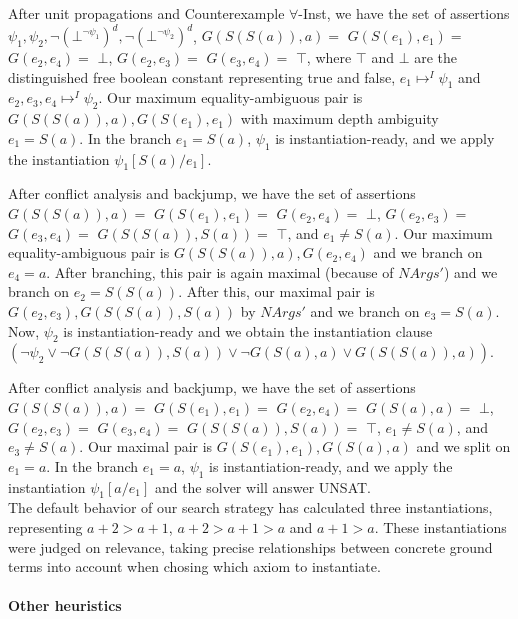 \documentclass{llncs}
\begin{document}
After unit propagations and Counterexample $\forall$-Inst, we have the set of assertions $\psi_1, \psi_2, \neg ( \bot^{\neg \psi_1 })^d, \neg ( \bot^{\neg \psi_2 })^d$, $G( S(S(a)), a) =$ $G( S(e_1), e_1) =$ $G( e_2, e_4 ) =$ $\bot$, $G( e_2, e_3 ) =$ $G( e_3, e_4 ) =$ $\top$, where $\top$ and $\bot$ are the distinguished free boolean constant representing true and false, $e_1 \mapsto^I \psi_1$ and $e_2, e_3, e_4 \mapsto^I \psi_2$.
Our maximum equality-ambiguous pair is $G( S(S(a)), a), G( S(e_1), e_1)$ with maximum depth ambiguity $e_1 = S( a )$.
In the branch $e_1 = S( a )$, $\psi_1$ is instantiation-ready, and we apply the instantiation $\psi_1[S(a)/e_1]$.

After conflict analysis and backjump, we have the set of assertions $G( S(S(a)), a) =$ $G( S(e_1), e_1) =$ $G( e_2, e_4 ) =$ $\bot$, $G( e_2, e_3 ) =$ $G( e_3, e_4 ) =$ $G( S( S( a ) ), S( a )) =$ $\top$, and $e_1 \neq S( a )$.
Our maximum equality-ambiguous pair is $G( S(S(a)), a), G( e_2, e_4 )$ and we branch on $e_4 = a$.
After branching, this pair is again maximal (because of $NArgs'$) and we branch on $e_2 = S( S( a ) )$.
After this, our maximal pair is $G( e_2, e_3 ), G( S( S( a ) ), S( a ))$ by $NArgs'$ and we branch on $e_3 = S( a )$.
Now, $\psi_2$ is instantiation-ready and we obtain the instantiation clause $( \neg \psi_2 \vee \neg G(S( S( a ) ),S( a )) \vee \neg G(S( a ),a) \vee G(S( S( a ) ),a))$.

After conflict analysis and backjump, we have the set of assertions $G( S(S(a)), a) =$ $G( S(e_1), e_1) =$ $G( e_2, e_4 ) =$ $G(S( a ),a) =$ $\bot$, $G( e_2, e_3 ) =$ $G( e_3, e_4 ) =$ $G( S( S( a ) ), S( a )) =$ $\top$, $e_1 \neq S( a )$, and $e_3 \neq S( a )$.
Our maximal pair is $G( S(e_1), e_1), G( S( a ), a )$ and we split on $e_1 = a$.
In the branch $e_1 = a$, $\psi_1$ is instantiation-ready, and we apply the instantiation $\psi_1[a/e_1]$ and the solver will answer UNSAT. \\

The default behavior of our search strategy has calculated three instantiations, representing $a + 2 > a + 1$, $a + 2 > a + 1 > a$ and $a + 1 > a$.
These instantiations were judged on relevance, taking precise relationships between concrete ground terms into account when chosing which axiom to instantiate.

\paragraph{Other heuristics}
\end{document}

